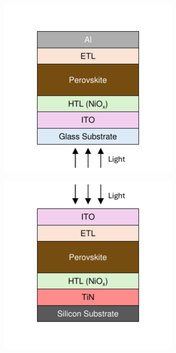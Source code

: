 \begin{figure}[htbp]
    \centering
    \begin{subfigure}[t]{0.4\textwidth} %
        \centering
        \includegraphics[width=\textwidth]{chapters/material_properties/images/Glass_Stack.pdf} %
        \caption{}
        \label{fig:ch2:glass_stack}
    \end{subfigure}
    \hfill %
    \begin{subfigure}[t]{0.4\textwidth} %
        \centering
        \includegraphics[width=\textwidth]{chapters/material_properties/images/PIX_Stack.pdf} %
        \caption{}
        \label{fig:ch2:pix_stack}
    \end{subfigure}


\end{figure}
